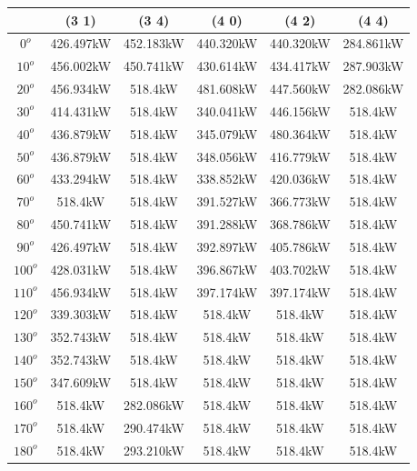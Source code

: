         \begin{table}[H]
        	\centering
        	\begin{tabular}{|c|c|c|c|c|c|} \hline
        		& (3 1)		& (3 4)		& (4 0)		& (4 2)		& (4 4)		\\ \hline
        		$0^o$	& 426.497kW	& 452.183kW	& 440.320kW	& 440.320kW	& 284.861kW	\\ \hline
        		$10^o$	& 456.002kW	& 450.741kW	& 430.614kW	& 434.417kW	& 287.903kW	\\ \hline
        		$20^o$	& 456.934kW	& 518.4kW	& 481.608kW	& 447.560kW	& 282.086kW	\\ \hline
        		$30^o$	& 414.431kW	& 518.4kW	& 340.041kW	& 446.156kW	& 518.4kW	\\ \hline
        		$40^o$	& 436.879kW	& 518.4kW	& 345.079kW	& 480.364kW	& 518.4kW	\\ \hline
        		$50^o$	& 436.879kW	& 518.4kW	& 348.056kW	& 416.779kW	& 518.4kW	\\ \hline
        		$60^o$	& 433.294kW	& 518.4kW	& 338.852kW	& 420.036kW	& 518.4kW	\\ \hline
        		$70^o$	& 518.4kW	& 518.4kW	& 391.527kW	& 366.773kW	& 518.4kW	\\ \hline
        		$80^o$	& 450.741kW	& 518.4kW	& 391.288kW	& 368.786kW	& 518.4kW	\\ \hline
        		$90^o$	& 426.497kW	& 518.4kW	& 392.897kW	& 405.786kW	& 518.4kW	\\ \hline
        		$100^o$	& 428.031kW	& 518.4kW	& 396.867kW	& 403.702kW	& 518.4kW	\\ \hline
        		$110^o$	& 456.934kW	& 518.4kW	& 397.174kW	& 397.174kW	& 518.4kW	\\ \hline
        		$120^o$	& 339.303kW	& 518.4kW	& 518.4kW	& 518.4kW	& 518.4kW	\\ \hline
        		$130^o$	& 352.743kW	& 518.4kW	& 518.4kW	& 518.4kW	& 518.4kW	\\ \hline
        		$140^o$	& 352.743kW	& 518.4kW	& 518.4kW	& 518.4kW	& 518.4kW	\\ \hline
        		$150^o$	& 347.609kW	& 518.4kW	& 518.4kW	& 518.4kW	& 518.4kW	\\ \hline
        		$160^o$	& 518.4kW	& 282.086kW	& 518.4kW	& 518.4kW	& 518.4kW	\\ \hline
        		$170^o$	& 518.4kW	& 290.474kW	& 518.4kW	& 518.4kW	& 518.4kW	\\ \hline
        		$180^o$	& 518.4kW	& 293.210kW	& 518.4kW	& 518.4kW	& 518.4kW	\\ \hline

\end{tabular}
\end{table}
